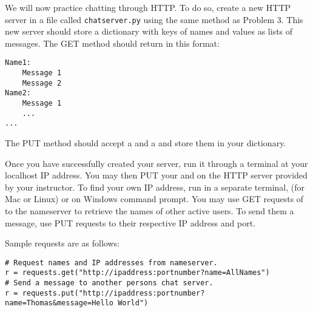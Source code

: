 \begin{problem}
We will now practice chatting through HTTP.
To do so, create a new HTTP server in a file called \texttt{chatserver.py} using the same method as Problem 3. %
This new server should store a dictionary with keys of names and values as lists of messages.
The GET method should return in this format:
\begin{lstlisting}
Name1:
	Message 1
	Message 2
Name2:
	Message 1
	...
...
\end{lstlisting}
The PUT method should accept a  and a  and store them in your dictionary.

Once you have successfully created your server, run it through a terminal at your localhost IP address.
You may then PUT your  and  on the HTTP server provided by your instructor.
To find your own IP address, run in a separate terminal,  (for Mac or Linux) or  on Windows command prompt.
You may use GET requests of  to the nameserver to retrieve the names of other active users.
To send them a message, use PUT requests to their respective IP address and port.

Sample requests are as follows:

\begin{lstlisting}
# Request names and IP addresses from nameserver.
r = requests.get("http://ipaddress:portnumber?name=AllNames")
# Send a message to another persons chat server.
r = requests.put("http://ipaddress:portnumber?name=Thomas&message=Hello World")
\end{lstlisting}


\begin{center}
		

\end{center}
\end{problem}
